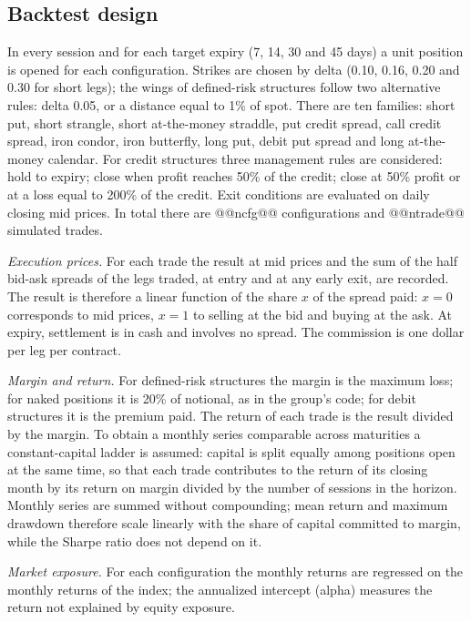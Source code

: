 \documentclass[11pt,a4paper]{article}
\begin{document}
\subsection{Backtest design}

In every session and for each target expiry (7, 14, 30 and 45 days) a unit position is opened for each configuration. Strikes are chosen by delta (0.10, 0.16, 0.20 and 0.30 for short legs); the wings of defined-risk structures follow two alternative rules: delta 0.05, or a distance equal to 1\% of spot. There are ten families: short put, short strangle, short at-the-money straddle, put credit spread, call credit spread, iron condor, iron butterfly, long put, debit put spread and long at-the-money calendar. For credit structures three management rules are considered: hold to expiry; close when profit reaches 50\% of the credit; close at 50\% profit or at a loss equal to 200\% of the credit. Exit conditions are evaluated on daily closing mid prices. In total there are @@ncfg@@ configurations and @@ntrade@@ simulated trades.

\emph{Execution prices.} For each trade the result at mid prices and the sum of the half bid-ask spreads of the legs traded, at entry and at any early exit, are recorded. The result is therefore a linear function of the share $x$ of the spread paid: $x=0$ corresponds to mid prices, $x=1$ to selling at the bid and buying at the ask. At expiry, settlement is in cash and involves no spread. The commission is one dollar per leg per contract.

\emph{Margin and return.} For defined-risk structures the margin is the maximum loss; for naked positions it is 20\% of notional, as in the group's code; for debit structures it is the premium paid. The return of each trade is the result divided by the margin. To obtain a monthly series comparable across maturities a constant-capital ladder is assumed: capital is split equally among positions open at the same time, so that each trade contributes to the return of its closing month by its return on margin divided by the number of sessions in the horizon. Monthly series are summed without compounding; mean return and maximum drawdown therefore scale linearly with the share of capital committed to margin, while the Sharpe ratio does not depend on it.

\emph{Market exposure.} For each configuration the monthly returns are regressed on the monthly returns of the index; the annualized intercept (alpha) measures the return not explained by equity exposure.
\end{document}
